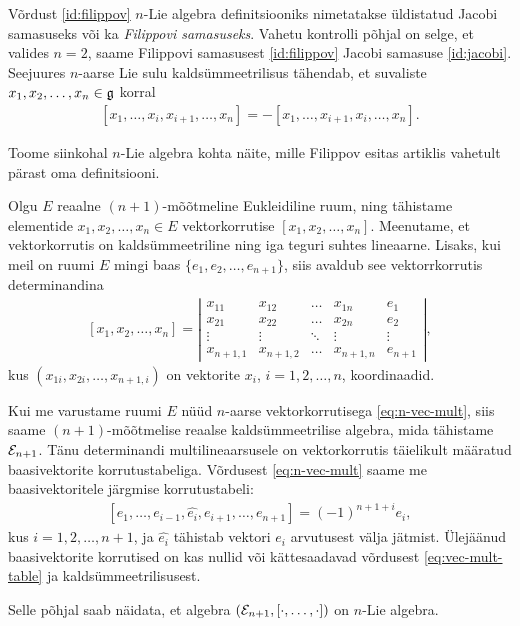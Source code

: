 Võrdust \eqref{id:filippov} $n$-Lie algebra definitsiooniks
nimetatakse üldistatud Jacobi samasuseks või ka
\emph{Filippovi samasuseks}. Vahetu kontrolli põhjal
on selge, et valides $n = 2$, saame Filippovi samasusest
\eqref{id:filippov} Jacobi samasuse \eqref{id:jacobi}. Seejuures
$n$-aarse Lie sulu kaldsümmeetrilisus tähendab, et
suvaliste $x_1, x_2, \dots, x_n \in \mathfrak{g}$ korral
\begin{align}\label{def:n-lie-brac-antisymm}
    [x_1, \dots, x_i, x_{i+1}, \dots, x_n] =
    -[x_1, \dots, x_{i+1}, x_i, \dots, x_n].
\end{align}

Toome siinkohal $n$-Lie algebra kohta näite, mille
Filippov esitas artiklis \cite{filippov1985} vahetult
pärast oma definitsiooni.

\begin{naide}
    Olgu $E$ reaalne $(n+1)$-mõõtmeline Eukleidiline ruum,
    ning tähistame elementide $x_1, x_2, \dots, x_n \in E$
    vektorkorrutise $[x_1, x_2, \dots, x_n]$. Meenutame, 
    et vektorkorrutis on kaldsümmeetriline ning iga teguri
    suhtes lineaarne. Lisaks, kui meil on ruumi $E$ mingi
    baas $\{e_1, e_2, \dots, e_{n+1}\}$, siis avaldub see
    vektorrkorrutis determinandina
    \begin{align}\label{eq:n-vec-mult}
        [x_1, x_2, \dots, x_n] = \left|\begin{matrix}
          x_{11}    & x_{12}    & \dots  & x_{1n}    & e_1    \\
          x_{21}    & x_{22}    & \dots  & x_{2n}    & e_2    \\
          \vdots    & \vdots    & \ddots & \vdots    & \vdots \\
          x_{n+1,1} & x_{n+1,2} & \dots  & x_{n+1,n} & e_{n+1}
        \end{matrix}\right|,
    \end{align}
    kus $(x_{1i}, x_{2i}, \dots, x_{n+1,i})$ on vektorite
    $x_i$, $i = 1, 2, \dots, n$, koordinaadid.

    Kui me varustame ruumi $E$ nüüd $n$-aarse vektorkorrutisega
    \eqref{eq:n-vec-mult}, siis saame $(n+1)$-mõõtmelise
    reaalse kaldsümmeetrilise algebra, mida tähistame
    $\mathcal{E}_{n+1}$. Tänu determinandi multilineaarsusele on
    vektorkorrutis täielikult määratud baasivektorite
    korrutustabeliga. Võrdusest \eqref{eq:n-vec-mult} saame
    me baasivektoritele järgmise korrutustabeli:
    \begin{align}\label{eq:vec-mult-table}
        [e_1, \dots, e_{i-1}, \hat{e_i}, e_{i+1}, \dots, e_{n+1}]
        = (-1)^{n+1+i} e_i,
    \end{align}
    kus $i = 1, 2, \dots, n+1$, ja $\hat{e_i}$ tähistab
    vektori $e_i$ arvutusest välja jätmist. Ülejäänud
    baasivektorite korrutised on kas nullid või kättesaadavad
    võrdusest \eqref{eq:vec-mult-table} ja
    kaldsümmeetrilisusest.

    Selle põhjal saab näidata, et algebra
    $(\mathcal{E}_{n+1}, [\cdot, \dots, \cdot])$ on $n$-Lie
    algebra. \cite{filippov1985}
\end{naide}

